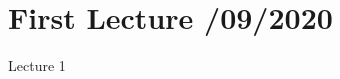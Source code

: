 \documentclass[../../main/main.tex]{subfiles}
\begin{document}
\section{First Lecture /09/2020}
\label{sec:lec1}

Lecture 1
\end{document}
